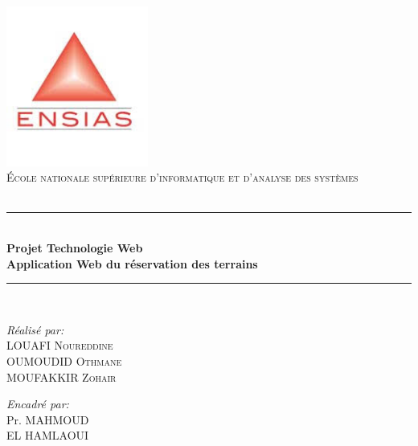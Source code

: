 \documentclass[a4paper]{report}
\begin{document}
\begin{spacing}{2}
\newcommand{\HRule}{\rule{\linewidth}{0.5mm}}
\begin{titlepage}
\begin{center}

\includegraphics[width=0.35\textwidth]{./logo}~\\[1cm]

\textsc{\LARGE École nationale supérieure d'informatique et d'analyse des systèmes}\\[1.5cm]

\textsc{\Large }\\[0.5cm]

\HRule \\[0.4cm]

{\huge \bfseries Projet Technologie Web \\
Application Web du réservation des terrains \\[0.4cm] }

\HRule \\[1.5cm]

\begin{minipage}{0.4\textwidth}
\begin{flushleft} \large
\emph{Réalisé par:}\\
\textsc{LOUAFI Noureddine}\\
\textsc{OUMOUDID Othmane}\\
\textsc{MOUFAKKIR Zohair}\\
\end{flushleft}
\end{minipage}
\begin{minipage}{0.4\textwidth}
\begin{flushright} \large
\emph{Encadré par:} \\
Pr. \textsc{MAHMOUD\\EL HAMLAOUI}\\
\end{flushright}
\end{minipage}


\end{center}
\end{titlepage}
\end{spacing}
\end{document}
